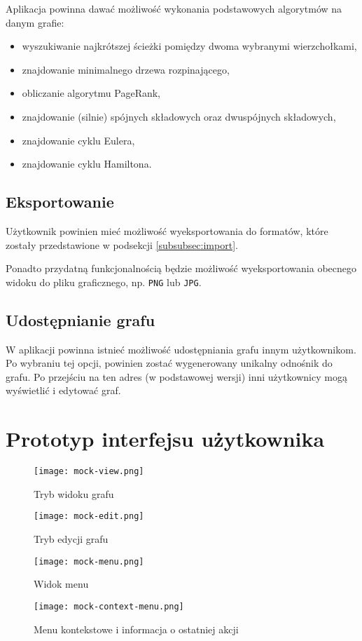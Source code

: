 Aplikacja powinna dawać możliwość wykonania podstawowych algorytmów na danym grafie:

\begin{itemize}
\setlength\itemsep{0em}
\item wyszukiwanie najkrótszej ścieżki pomiędzy dwoma wybranymi wierzchołkami,
\item znajdowanie minimalnego drzewa rozpinającego,
\item obliczanie algorytmu PageRank,
\item znajdowanie (silnie) spójnych składowych oraz dwuspójnych składowych,
\item znajdowanie cyklu Eulera,
\item znajdowanie cyklu Hamiltona.
\end{itemize}

\subsection{Eksportowanie}
Użytkownik powinien mieć możliwość wyeksportowania do formatów, które zostały przedstawione w podsekcji \ref{subsubsec:import}. 

Ponadto przydatną funkcjonalnością będzie możliwość wyeksportowania obecnego widoku do pliku graficznego, np. \texttt{PNG} lub \texttt{JPG}. 

\subsection{Udostępnianie grafu}
W aplikacji powinna istnieć możliwość udostępniania grafu innym użytkownikom. Po wybraniu tej opcji, powinien zostać wygenerowany unikalny odnośnik do grafu. Po przejściu na ten adres (w podstawowej wersji) inni użytkownicy mogą wyświetlić i edytować graf.



\section{Prototyp interfejsu użytkownika}

\begin{figure}[H]
\caption{Tryb widoku grafu}
\centering
\texttt{[image: mock-view.png]}
\end{figure}

\begin{figure}[H]
\caption{Tryb edycji grafu}
\centering
\texttt{[image: mock-edit.png]}
\end{figure}

\begin{figure}[H]
\caption{Widok menu}
\centering
\texttt{[image: mock-menu.png]}
\end{figure}

\begin{figure}[H]
\caption{Menu kontekstowe i informacja o ostatniej akcji}
\centering
\texttt{[image: mock-context-menu.png]}
\end{figure}